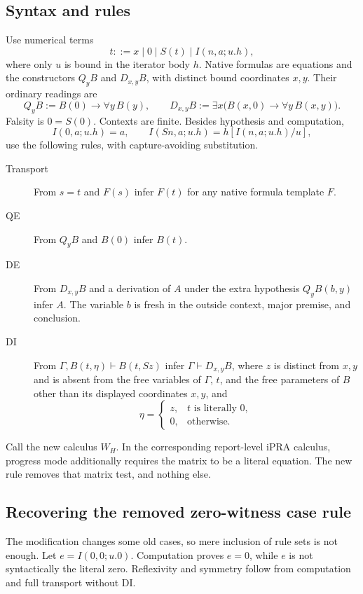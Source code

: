 \documentclass[11pt,letterpaper]{article}
\begin{document}
\subsection{Syntax and rules}

Use numerical terms
\[
 t::=x\mid0\mid S(t)\mid I(n,a;u.h),
\]
where only $u$ is bound in the iterator body $h$. Native formulas are
equations and the constructors $Q_yB$ and $D_{x,y}B$, with distinct bound
coordinates $x,y$. Their ordinary readings are
\[
 Q_yB:=B(0)\to\forall y\,B(y),\qquad
 D_{x,y}B:=\exists x\bigl(B(x,0)\to\forall y\,B(x,y)\bigr).
\]
Falsity is $0=S(0)$. Contexts are finite. Besides hypothesis and computation,
\[
 I(0,a;u.h)=a,\qquad I(Sn,a;u.h)=h[I(n,a;u.h)/u],
\]
use the following rules, with capture-avoiding substitution.
\begin{description}
\item[Transport] From $s=t$ and $F(s)$ infer $F(t)$ for any native formula
template $F$.
\item[QE] From $Q_yB$ and $B(0)$ infer $B(t)$.
\item[DE] From $D_{x,y}B$ and a derivation of $A$ under the extra hypothesis
$Q_yB(b,y)$ infer $A$. The variable $b$ is fresh in the outside context,
major premise, and conclusion.
\item[DI] From $\Gamma,B(t,\eta)\vdash B(t,Sz)$ infer
$\Gamma\vdash D_{x,y}B$, where $z$ is distinct from $x,y$ and is absent
from the free variables of $\Gamma$, $t$, and the free parameters of $B$
other than its displayed coordinates $x,y$, and
\[
 \eta=\begin{cases}z,&t\text{ is literally }0,\\0,&\text{otherwise}.
 \end{cases}
\]
\end{description}
Call the new calculus $W_H$. In the corresponding report-level iPRA
calculus, progress mode additionally requires the matrix to be a literal
equation. The new rule removes that matrix test, and nothing else.

\subsection{Recovering the removed zero-witness case rule}

The modification changes some old cases, so mere inclusion of rule sets is
not enough. Let $e=I(0,0;u.0)$. Computation proves $e=0$, while $e$ is not
syntactically the literal zero. Reflexivity and symmetry follow from
computation and full transport without DI.
\end{document}
